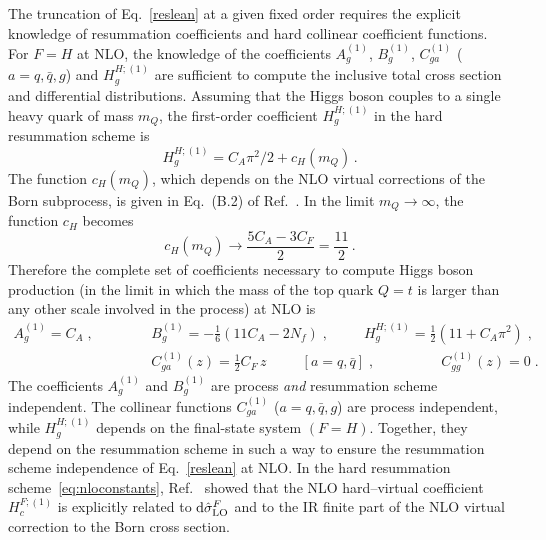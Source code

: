 \documentclass[12pt]{article}
\def\beeq{\begin{eqnarray}}
\def\eeeq{\end{eqnarray}}
\def\nn{\nonumber}
\newcommand\f[2]{\frac{#1}{#2}}
\def\to{\rightarrow}
\DeclareRobustCommand{\rd}{\ensuremath{\mathrm{d}}}
\begin{document}
The truncation of Eq.~\eqref{reslean} at a given fixed order requires the explicit knowledge of resummation coefficients and hard collinear coefficient functions.
For $F=H$ at NLO, the knowledge of the coefficients $A^{(1)}_{g}$, $B^{(1)}_{g}$, $C^{(1)}_{ga}$ ($a=q,{\bar q},g$) and $H^{H;(1)}_{g}$ are sufficient to compute the inclusive total cross section and differential distributions. Assuming that the Higgs boson couples to a single heavy quark of mass $m_Q$, the first-order coefficient $H_g^{H;(1)}$ in the hard resummation scheme is~\cite{Catani:2013tia}
\begin{equation}
\label{H1g}
H_g^{H;(1)}=C_A\pi^2/2+c_H(m_Q)\, .
\end{equation}
The function $c_H(m_Q)$, which depends on the NLO virtual corrections of the Born subprocess, is given in Eq.~(B.2) of Ref.~\cite{Spira:1995rr}. In the limit $m_Q\to \infty$, the function $c_H$ becomes
\begin{equation}
c_H(m_Q)\longrightarrow\f{5C_A-3C_F}{2}=\f{11}{2}\, .
\end{equation}
Therefore the complete set of coefficients necessary to compute Higgs boson production (in the limit in which the mass of the top quark $Q=t$ is larger than any other scale involved in the process) at NLO is
\beeq
\label{eq:nloconstants}
A^{(1)}_{g}=C_{A}\;,\;\;\;\;\;\;\;\;\;&&B^{(1)}_{g}=- \f{1}{6} \left( 11 C_A - 2 N_f \right)\;,\;\;\;\;\;\;\;\;\;H^{H;(1)}_{g}=\f{1}{2}(11+C_{A}\pi^{2})\;,\nn\\
&&\!\!\!\!\!\!\!\!\!\!\!\!\!\!\!\!\!\!\!\!\!\!\!\!\!\!\!\!\!\!\!\!\!C^{(1)}_{ga}(z)=\f{1}{2}C_F\, z\;\;\;\;\;\;\;\;\;\left[a=q,{\bar q}\right]\;,\;\;\;\;\;\;\;\;\;\;\;\;\;\;\;\;\;C^{(1)}_{gg}(z)=0\;.
\eeeq
The coefficients $A^{(1)}_{g}$ and $B^{(1)}_{g}$ are process {\em and} resummation scheme independent. The collinear functions $C^{(1)}_{ga}$ ($a=q,{\bar q},g$) are process independent, while $H^{H;(1)}_{g}$ depends on the final-state system $(F=H)$. Together,  they depend on the resummation scheme in such a way to ensure the resummation scheme independence of Eq.~\eqref{reslean} at NLO. In the hard resummation scheme~\eqref{eq:nloconstants},  Ref.~\cite{deFlorian:2001zd} showed that the NLO hard--virtual coefficient $H^{F;(1)}_{c}$ is explicitly related to $\rd{\hat \sigma}^{F}_{\rm LO}$ and to the IR finite part of the NLO virtual correction to the Born cross section. 
\end{document}
